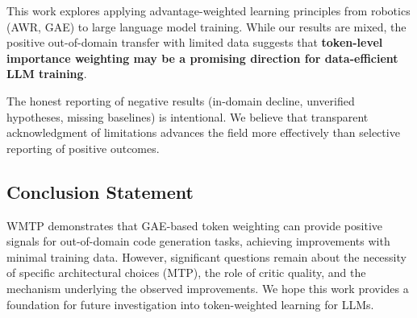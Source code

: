 This work explores applying advantage-weighted learning principles from robotics (AWR, GAE) to large language model training. While our results are mixed, the positive out-of-domain transfer with limited data suggests that \textbf{token-level importance weighting may be a promising direction for data-efficient LLM training}.

The honest reporting of negative results (in-domain decline, unverified hypotheses, missing baselines) is intentional. We believe that transparent acknowledgment of limitations advances the field more effectively than selective reporting of positive outcomes.

\subsection{Conclusion Statement}

WMTP demonstrates that GAE-based token weighting can provide positive signals for out-of-domain code generation tasks, achieving improvements with minimal training data. However, significant questions remain about the necessity of specific architectural choices (MTP), the role of critic quality, and the mechanism underlying the observed improvements. We hope this work provides a foundation for future investigation into token-weighted learning for LLMs.
